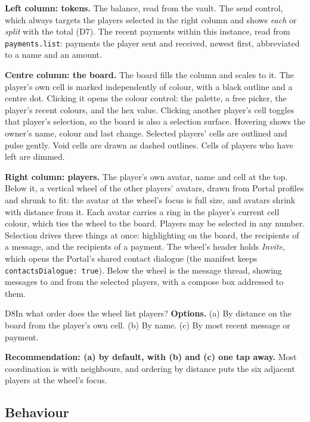 \documentclass[11pt,a4paper]{article}
\newcommand{\code}[1]{\texttt{#1}}
\begin{document}
\textbf{Left column: tokens.} The balance, read from the vault. The send control, which always
targets the players selected in the right column and shows \emph{each} or \emph{split} with the
total (D7). The recent payments within this instance, read from \code{payments.list}: payments
the player sent and received, newest first, abbreviated to a name and an amount.

\textbf{Centre column: the board.} The board fills the column and scales to it. The player's
own cell is marked independently of colour, with a black outline and a centre dot. Clicking it
opens the colour control: the palette, a free picker, the player's recent colours, and the hex
value. Clicking another player's cell toggles that player's selection, so the board is also a
selection surface. Hovering shows the owner's name, colour and last change. Selected
players' cells are outlined and pulse gently. Void cells are drawn as dashed outlines. Cells
of players who have left are dimmed.

\textbf{Right column: players.} The player's own avatar, name and cell at the top. Below it, a
vertical wheel of the other players' avatars, drawn from Portal profiles and shrunk to fit:
the avatar at the wheel's focus is full size, and avatars shrink with distance from it. Each
avatar carries a ring in the player's current cell colour, which ties the wheel to the board.
Players may be selected in any number. Selection drives three things at once: highlighting on
the board, the recipients of a message, and the recipients of a payment. The wheel's header
holds \emph{Invite}, which opens the Portal's shared contact dialogue (the manifest keeps
\code{contactsDialogue: true}). Below the wheel is the message thread, showing messages to and
from the selected players, with a compose box addressed to them.

\begin{decision}{D8}{In what order does the wheel list players?}
\textbf{Options.} (a) By distance on the board from the player's own cell. (b) By name. (c) By
most recent message or payment.

\textbf{Recommendation: (a) by default, with (b) and (c) one tap away.} Most coordination is
with neighbours, and ordering by distance puts the six adjacent players at the wheel's focus.
\end{decision}

\subsection{Behaviour}
\end{document}
